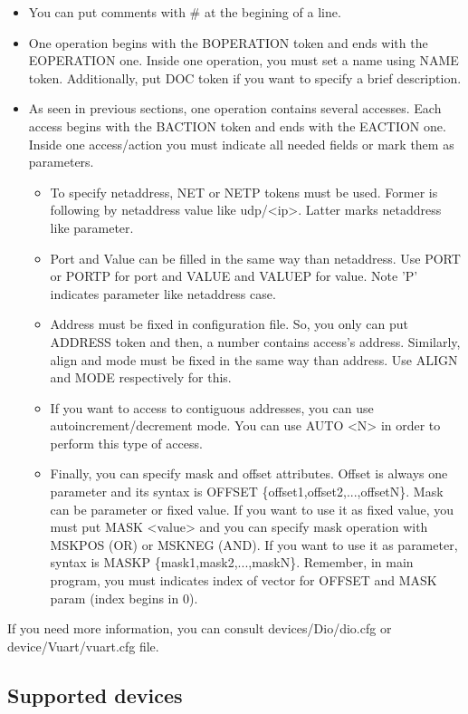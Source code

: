 \begin{itemize}
 \item {You can put comments with \# at the begining of a line.}
 \item {One operation begins with the BOPERATION token and ends with the EOPERATION one. Inside one operation, you must set a name using NAME token. Additionally, put DOC token if you want to specify a brief description.}
 \item{As seen in previous sections, one operation contains several accesses. Each access begins with the BACTION token and ends with the EACTION one. Inside one access/action you must indicate all needed fields or mark them as parameters.}
 \begin{itemize}
    \item{To specify netaddress, NET or NETP tokens must be used. Former is following by netaddress value like udp/<ip>. Latter marks netaddress like parameter.}
    \item{Port and Value can be filled in the same way than netaddress. Use PORT or PORTP for port and VALUE and VALUEP for value. Note 'P' indicates parameter like netaddress case.}
    \item{Address must be fixed in configuration file. So, you only can put ADDRESS token and then, a number contains access's address. Similarly, align and mode must be fixed in the same way than address. Use ALIGN and MODE respectively for this.}
    \item{If you want to access to contiguous addresses, you can use autoincrement/decrement mode. You can use  AUTO <N> in order to perform this type of access.}
    \item{Finally, you can specify mask and offset attributes. Offset is always one parameter and its syntax is OFFSET \{offset1,offset2,...,offsetN\}. Mask can be parameter or fixed value. If you want to use it as fixed value, you must put MASK <value> and you can specify mask operation with MSKPOS (OR) or MSKNEG (AND). If you want to use it as parameter, syntax is MASKP \{mask1,mask2,...,maskN\}. Remember, in main program, you must indicates index of vector for OFFSET and MASK param (index begins in 0).}
 \end{itemize}
\end{itemize}

If you need more information, you can consult devices/Dio/dio.cfg or device/Vuart/vuart.cfg file.

\subsection{Supported devices}

